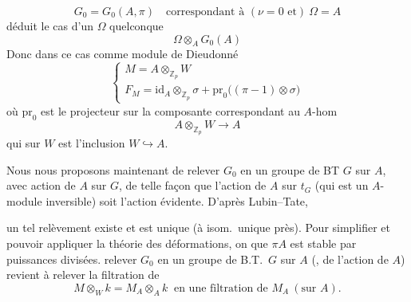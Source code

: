 \documentclass[11pt,a4paper]{article}
\begin{document}

\[
G_0 = G_0(A, \pi) \quad \text{correspondant à } (\nu = 0 \text{ et})\ \Omega = A
\]
 déduit le cas d'un $\Omega$ quelconque 
\[
\Omega \otimes_A G_0(A)
\]
Donc  dans ce cas comme module de Dieudonné
\[
\begin{cases}
M = A \otimes_{\mathbb{Z}_p} W \\
F_M = \mathrm{id}_A \otimes_{\mathbb{Z}_p} \sigma + \mathrm{pr}_0\bigl((\pi - 1) \otimes \sigma\bigr)
\end{cases}
\]
où $\mathrm{pr}_0$ est le projecteur sur la composante correspondant au
$A$-hom
\[
A \otimes_{\mathbb{Z}_p} W \to A
\]
qui sur $W$ est l'inclusion $W \hookrightarrow A$.


Nous nous proposons maintenant de relever $G_0$  en un
groupe de BT $G$ sur $A$, avec action de $A$ sur $G$, de telle façon que
l'action  de $A$ sur $t_G$ (qui est un $A$-module
inversible) soit l'action évidente. D'après Lubin--Tate,


un tel relèvement existe et est unique (à isom.\ unique près).
\struck{\ill{}} Pour simplifier et pouvoir appliquer la théorie des
déformations, on  que $\pi A$ est stable par puissances
divisées. \ill{} relever $G_0$ en un groupe de B.T.\ $G$ sur $A$
(, \ill{} \ill{} de l'action de $A$) revient à
relever la filtration de
\[
M \otimes_W k = M_A \otimes_A k \ \text{ en une filtration de } M_A \ (\text{sur } A).
\]


\end{document}
